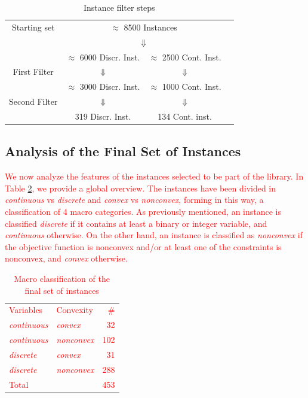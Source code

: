 \begin{table}
 \centering
 \setlength{\tabcolsep}{5pt}
\begin{tabular}{cccc}
Starting set& \multicolumn{ 2}{c}{ $\approx$ 8500 Instances }& \\
& \multicolumn{ 2}{c}{$\Downarrow$}& \\
& $\approx$ 6000 Discr. Inst.  & $\approx$ 2500 Cont. Inst. & \\
First Filter  & $\Downarrow$  & $\Downarrow$ & \\
 & $\approx$ 3000 Discr. Inst.  & $\approx$ 1000 Cont. Inst. & \\
Second Filter & $\Downarrow$  & $\Downarrow$  & \\
  & 319 Discr. Inst.  & 134  Cont. inst. & \\
\end{tabular}
\caption{Instance filter steps} \label{tab:filters}
\end{table}

\subsection{Analysis of the Final Set of Instances}\label{subsec:final set}

\textcolor{red}{We now analyze the features of the instances selected to be part of the
 library. In Table \ref{tab:DDDDD}, we provide a global overview. The instances have been divided in \textit{continuous} vs \textit{discrete} and \textit{convex} vs \textit{nonconvex}, forming in this way, a  classification of 4 macro categories. As previously mentioned, an instance is classified \textit{discrete} if it contains at least a binary or integer variable, and \textit{continuous} otherwise. On the other hand, an instance is classified as \textit{nonconvex} if the objective function is nonconvex and/or at least one of the constraints is nonconvex, and \textit{convex} otherwise. }


\begin{table}
\textcolor{red}{
 \centering
 \setlength{\tabcolsep}{18pt}
 \renewcommand \arraystretch{1.1}
\begin{tabular}{llr}
\toprule
Variables & Convexity & \#\\
\cmidrule(lr){1-3}
%
 \textit{continuous}	& \textit{convex}		&  32 \\[1.2 ex]
 \textit{continuous}	& \textit{nonconvex} 	&  102 \\[1.2 ex]
 \textit{discrete}	& \textit{convex}		&  31 \\[1.2 ex]
 \textit{discrete}	& \textit{nonconvex}	&  288 \\[1.2 ex]
\cmidrule(lr){1-3}
Total		&				& 453\\
%
\bottomrule
\end{tabular}
\caption{Macro classification of the final set of instances}
\label{tab:DDDDD}
}
\end{table}


